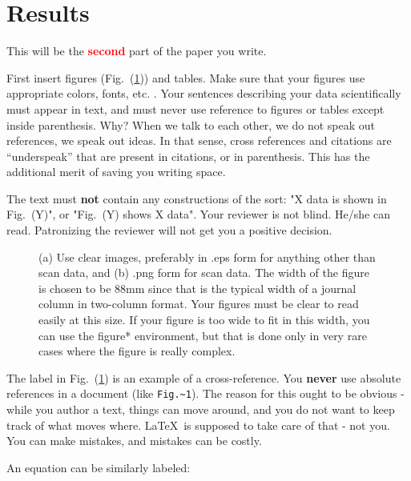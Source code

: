\documentclass[12 pt]{article}
\begin{document}
\section{Results}
\label{sec:results}

This will be the \textbf{\Huge \textcolor{red}{second}} part of the paper you write.

First insert figures (Fig.~(\ref{fig:cv})) and tables. Make sure that your figures use appropriate colors, fonts, etc. \cite{mcnames:2006}. Your sentences describing your data scientifically must appear in text, and must never use reference to figures or tables except inside parenthesis. Why? When we talk to each other, we do not speak out references, we speak out ideas. In that sense, cross references and citations are ``underspeak'' that are present in citations, or in parenthesis. This has the additional merit of saving you writing space.

The text must \textbf{not} contain any constructions of the sort: "X data is shown in Fig.~(Y)", or "Fig.~(Y) shows X data". Your reviewer is not blind. He/she can read. Patronizing the reviewer will not get you a positive decision.


\begin{figure}
\centering
{}
\caption{(a) Use clear images, preferably in .eps form for anything other than scan data, and (b) .png form for scan data. The width of the figure is chosen to be 88mm since that is the typical width of a journal column in two-column format. Your figures must be clear to read easily at this size. If your figure is too wide to fit in this width, you can use the figure* environment, but that is done only in very rare cases where the figure is really complex.}
\label{fig:cv}
\end{figure}

The label in Fig.~(\ref{fig:cv}) is an example of a cross-reference. You \textbf{never} use absolute references in a document (like \verb|Fig.~1|). The reason for this ought to be obvious - while you author a text, things can move around, and you do not want to keep track of what moves where. \LaTeX\ is supposed to take care of that - not you. You can make mistakes, and mistakes can be costly.

An equation can be similarly labeled:
\end{document}
